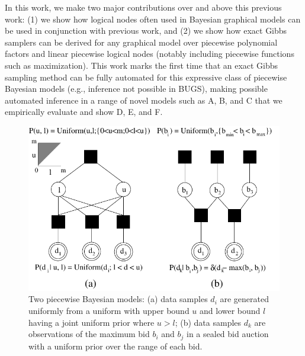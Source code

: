 \documentclass[letterpaper]{article}
\renewcommand{\-}{\text{-}}
\begin{document}
In this work, we make two major contributions over and above this
previous work: (1) we show how logical nodes often used in Bayesian
graphical models can be used in conjunction with previous work, and
(2) we show how exact Gibbs samplers can be derived for any graphical
model over piecewise polynomial factors and linear piecewise logical
nodes (notably including piecewise functions such as maximization).
This work marks the first time that an exact Gibbs sampling method can
be fully automated for this expressive class of piecewise Bayesian
models (e.g., inference not possible in BUGS), making possible
automated inference in a range of novel models such as A, B, and C
that we empirically evaluate and show D, E, and F.

\begin{figure}[t!]
\centering
\includegraphics[width=.50\textwidth]{uniform_max.pdf}
\vspace{-6mm}
\caption{\footnotesize Two piecewise Bayesian models: 
(a) data samples $d_i$ are generated uniformly from a uniform with 
upper bound $u$ and lower bound $l$ having a joint uniform prior where $u > l$;
(b) data samples $d_k$ are observations of the maximum bid $b_i$ and $b_j$
in a sealed bid auction with a uniform prior over the range of each bid.}
\label{fig:uniform_max}
\vspace{-4mm}
\end{figure}
\end{document}
